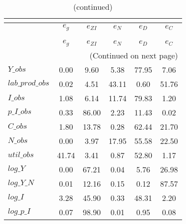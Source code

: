  
\begin{center}
\begin{longtable}{lccccc} 
\caption{VARIANCE DECOMPOSITION (in percent)}\\
 \label{Table:th_var_decomp_uncond}\\
\toprule 
$                $	 & 	 $       {e_g}$	 & 	 $    {e_{ZI}}$	 & 	 $       {e_N}$	 & 	 $       {e_D}$	 & 	 $       {e_C}$\\
\midrule \endfirsthead 
\caption{(continued)}\\
 \toprule \\ 
$                $	 & 	 $       {e_g}$	 & 	 $    {e_{ZI}}$	 & 	 $       {e_N}$	 & 	 $       {e_D}$	 & 	 $       {e_C}$\\
\midrule \endhead 
\midrule \multicolumn{6}{r}{(Continued on next page)} \\ \bottomrule \endfoot 
\bottomrule \endlastfoot 
$Y\_obs          $	 & 	        0.00	 & 	        9.60	 & 	        5.38	 & 	       77.95	 & 	        7.06 \\ 
$lab\_prod\_obs  $	 & 	        0.02	 & 	        4.51	 & 	       43.11	 & 	        0.60	 & 	       51.76 \\ 
$I\_obs          $	 & 	        1.08	 & 	        6.14	 & 	       11.74	 & 	       79.83	 & 	        1.20 \\ 
$p\_I\_obs       $	 & 	        0.33	 & 	       86.00	 & 	        2.23	 & 	       11.43	 & 	        0.02 \\ 
$C\_obs          $	 & 	        1.80	 & 	       13.78	 & 	        0.28	 & 	       62.44	 & 	       21.70 \\ 
$N\_obs          $	 & 	        0.00	 & 	        3.97	 & 	       17.95	 & 	       55.58	 & 	       22.50 \\ 
$util\_obs       $	 & 	       41.74	 & 	        3.41	 & 	        0.87	 & 	       52.80	 & 	        1.17 \\ 
$log\_Y          $	 & 	        0.00	 & 	       67.21	 & 	        0.04	 & 	        5.76	 & 	       26.98 \\ 
$log\_Y\_N       $	 & 	        0.01	 & 	       12.16	 & 	        0.15	 & 	        0.12	 & 	       87.57 \\ 
$log\_I          $	 & 	        3.28	 & 	       45.90	 & 	        0.33	 & 	       48.31	 & 	        2.20 \\ 
$log\_p\_I       $	 & 	        0.07	 & 	       98.90	 & 	        0.01	 & 	        0.95	 & 	        0.08 \\ 

\end{longtable}
\end{center}
